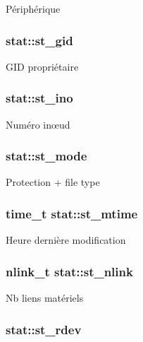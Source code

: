 Périphérique \hypertarget{structstat_ab864f16f436cec370f0ced585d897698}{
\subsubsection[{st\-\_\-gid}]{ stat\-::st\-\_\-gid}}\label{structstat_ab864f16f436cec370f0ced585d897698}
G\-I\-D propriétaire \hypertarget{structstat_a9769ed8f0d4c5a9f329c32bc92479d56}{
\subsubsection[{st\-\_\-ino}]{ stat\-::st\-\_\-ino}}\label{structstat_a9769ed8f0d4c5a9f329c32bc92479d56}
Numéro inœud \hypertarget{structstat_a5cbdd829011af82ba61e83773bbcbc7d}{
\subsubsection[{st\-\_\-mode}]{ stat\-::st\-\_\-mode}}\label{structstat_a5cbdd829011af82ba61e83773bbcbc7d}
Protection + file type \hypertarget{structstat_a77e235090f8cb6897f1c0ce65689006b}{
\subsubsection[{st\-\_\-mtime}]{\setlength{\rightskip}{0pt plus 5cm}time\-\_\-t stat\-::st\-\_\-mtime}}\label{structstat_a77e235090f8cb6897f1c0ce65689006b}
Heure dernière modification \hypertarget{structstat_a0ed9092fa6c77a3251b9b9a4738ef84f}{
\subsubsection[{st\-\_\-nlink}]{\setlength{\rightskip}{0pt plus 5cm}nlink\-\_\-t stat\-::st\-\_\-nlink}}\label{structstat_a0ed9092fa6c77a3251b9b9a4738ef84f}
Nb liens matériels \hypertarget{structstat_aa61e6c1a8a91c69f1d26f6700a0546cb}{
\subsubsection[{st\-\_\-rdev}]{ stat\-::st\-\_\-rdev}}\label{structstat_aa61e6c1a8a91c69f1d26f6700a0546cb}
